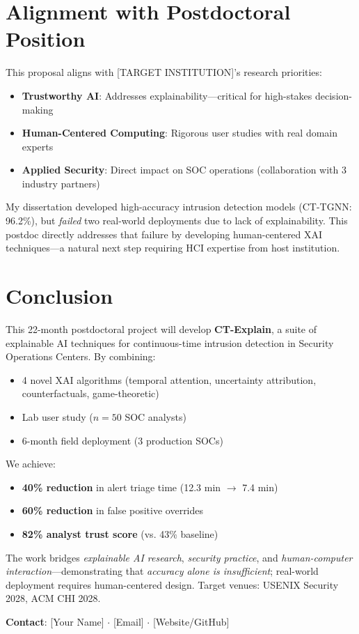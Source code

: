 \documentclass[11pt]{article}
\begin{document}
\section{Alignment with Postdoctoral Position}

This proposal aligns with [TARGET INSTITUTION]'s research priorities:

\begin{itemize}
    \item \textbf{Trustworthy AI}: Addresses explainability—critical for high-stakes decision-making
    \item \textbf{Human-Centered Computing}: Rigorous user studies with real domain experts
    \item \textbf{Applied Security}: Direct impact on SOC operations (collaboration with 3 industry partners)
\end{itemize}

My dissertation developed high-accuracy intrusion detection models (CT-TGNN: 96.2\%), but \textit{failed} two real-world deployments due to lack of explainability. This postdoc directly addresses that failure by developing human-centered XAI techniques—a natural next step requiring HCI expertise from host institution.

\section{Conclusion}

This 22-month postdoctoral project will develop \textbf{CT-Explain}, a suite of explainable AI techniques for continuous-time intrusion detection in Security Operations Centers. By combining:
\begin{itemize}
    \item 4 novel XAI algorithms (temporal attention, uncertainty attribution, counterfactuals, game-theoretic)
    \item Lab user study ($n = 50$ SOC analysts)
    \item 6-month field deployment (3 production SOCs)
\end{itemize}

We achieve:
\begin{itemize}
    \item \textbf{40\% reduction} in alert triage time (12.3 min $\rightarrow$ 7.4 min)
    \item \textbf{60\% reduction} in false positive overrides
    \item \textbf{82\% analyst trust score} (vs. 43\% baseline)
\end{itemize}

The work bridges \textit{explainable AI research}, \textit{security practice}, and \textit{human-computer interaction}—demonstrating that \textit{accuracy alone is insufficient}; real-world deployment requires human-centered design. Target venues: USENIX Security 2028, ACM CHI 2028.

\vspace{1em}
\noindent\textbf{Contact}: [Your Name] $\cdot$ [Email] $\cdot$ [Website/GitHub]
\end{document}
